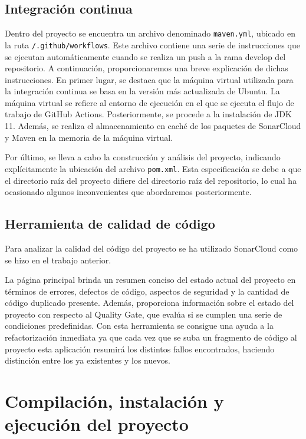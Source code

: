 \subsection{Integración continua}
Dentro del proyecto se encuentra un archivo denominado \texttt{maven.yml}, ubicado en la ruta \texttt{/.github/workflows}. Este archivo contiene una serie de instrucciones que se ejecutan automáticamente cuando se realiza un push a la rama develop del repositorio. A continuación, proporcionaremos una breve explicación de dichas instrucciones. 
En primer lugar, se destaca que la máquina virtual utilizada para la integración continua se basa en la versión más actualizada de Ubuntu. La máquina virtual se refiere al entorno de ejecución en el que se ejecuta el flujo de trabajo de GitHub Actions. Posteriormente, se procede a la instalación de JDK 11. Además, se realiza el almacenamiento en caché de los paquetes de SonarCloud y Maven en la memoria de la máquina virtual.

Por último, se lleva a cabo la construcción y análisis del proyecto, indicando explícitamente la ubicación del archivo \texttt{pom.xml}. Esta especificación se debe a que el directorio raíz del proyecto difiere del directorio raíz del repositorio, lo cual ha ocasionado algunos inconvenientes que abordaremos posteriormente.
\subsection{Herramienta de calidad de código}
Para analizar la calidad del código del proyecto se ha utilizado SonarCloud como se hizo en el trabajo anterior.

La página principal brinda un resumen conciso del estado actual del proyecto en términos de errores, defectos de código, aspectos de seguridad y la cantidad de código duplicado presente. Además, proporciona información sobre el estado del proyecto con respecto al Quality Gate, que evalúa si se cumplen una serie de condiciones predefinidas.
Con esta herramienta se consigue una ayuda a la refactorización inmediata ya que cada vez que se suba un fragmento de código al proyecto esta aplicación resumirá los distintos fallos encontrados, haciendo distinción entre los ya existentes y los nuevos.

\section{Compilación, instalación y ejecución del proyecto}
